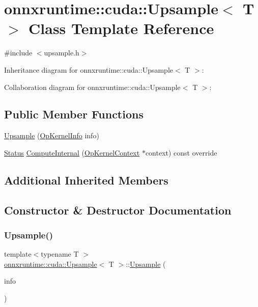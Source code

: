 \hypertarget{classonnxruntime_1_1cuda_1_1Upsample}{}\section{onnxruntime\+:\+:cuda\+:\+:Upsample$<$ T $>$ Class Template Reference}
\label{classonnxruntime_1_1cuda_1_1Upsample}


{\ttfamily \#include $<$upsample.\+h$>$}



Inheritance diagram for onnxruntime\+:\+:cuda\+:\+:Upsample$<$ T $>$\+:


Collaboration diagram for onnxruntime\+:\+:cuda\+:\+:Upsample$<$ T $>$\+:
\subsection*{Public Member Functions}
\begin{DoxyCompactItemize}
\item 
\mbox{\hyperlink{classonnxruntime_1_1cuda_1_1Upsample_a0067b4f499eca60ccbbffd64a8c7bf5b}{Upsample}} (\mbox{\hyperlink{classonnxruntime_1_1OpKernelInfo}{Op\+Kernel\+Info}} info)
\item 
\mbox{\hyperlink{classonnxruntime_1_1common_1_1Status}{Status}} \mbox{\hyperlink{classonnxruntime_1_1cuda_1_1Upsample_a78a79ebb66c859d3c6f97dde1e7ec4f0}{Compute\+Internal}} (\mbox{\hyperlink{classonnxruntime_1_1OpKernelContext}{Op\+Kernel\+Context}} $\ast$context) const override
\end{DoxyCompactItemize}
\subsection*{Additional Inherited Members}


\subsection{Constructor \& Destructor Documentation}
\mbox{\label{classonnxruntime_1_1cuda_1_1Upsample_a0067b4f499eca60ccbbffd64a8c7bf5b}} 
\subsubsection{\texorpdfstring{Upsample()}{Upsample()}}
{\footnotesize\ttfamily template$<$typename T $>$ \\
\mbox{\hyperlink{classonnxruntime_1_1cuda_1_1Upsample}{onnxruntime\+::cuda\+::\+Upsample}}$<$ T $>$\+::\mbox{\hyperlink{classonnxruntime_1_1cuda_1_1Upsample}{Upsample}} (\begin{DoxyParamCaption}\item[{\mbox{\hyperlink{classonnxruntime_1_1OpKernelInfo}{Op\+Kernel\+Info}}}]{info }\end{DoxyParamCaption})\hspace{0.3cm}{\ttfamily [inline]}}



